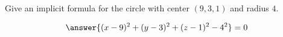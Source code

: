 \documentclass{ximera}
\author{Bart Snapp}
\begin{document}
\begin{exercise}
  Give an implicit formula for the circle with center $(9,3,1)$ and radius $4$.
  \begin{prompt}
  \[
  \answer{(x-9)^2 + (y-3)^2 + (z-1)^2-4^2}=0
  \]
  \end{prompt}
\end{exercise}
\end{document}

